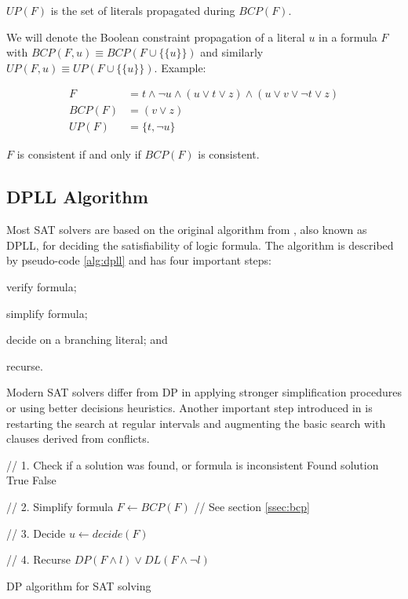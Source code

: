 \begin{mydef}
$UP(F)$ is the set of literals propagated during $BCP(F)$.
\end{mydef}

We will denote the Boolean constraint propagation of a literal $u$ in a
formula $F$ with $BCP(F, u) \equiv BCP(F \cup \{\{ u \}\})$
and similarly $UP(F, u) \equiv UP(F \cup \{\{ u \}\})$. Example:

\begin{align}
  F &= t \land \neg u \land (u \lor t \lor z) \land (u \lor v \lor \neg t \lor z) \\
  BCP(F) &= (v \lor z) \\
  UP(F) &= \{ t, \neg u \}
\end{align}

\begin{myprop}
  $F$ is consistent if and only if $BCP(F)$ is consistent.
\end{myprop}


\subsection{DPLL Algorithm}
\label{ssec:dpll}

Most SAT solvers are based on the original algorithm from
\cite{Davis:1962:MPT:368273.368557}, also known as DPLL, for deciding
the satisfiability of logic formula.  The algorithm is described
by pseudo-code \ref{alg:dpll} and has four important steps:
\begin{inparaenum}[1)]
  \item verify formula;
  \item simplify formula;
  \item decide on a branching literal; and
  \item recurse.
\end{inparaenum}

Modern SAT solvers differ from DP in applying
stronger simplification procedures or using better
decisions heuristics. Another important step introduced in
\cite{Marques-silva99grasp:a} is restarting the search at regular
intervals and augmenting the basic search with clauses derived
from conflicts.


\begin{algorithm}
  \begin{algorithmic}

    // 1. Check if a solution was found, or formula is inconsistent
      \PRINT Found solution
      \RETURN True
    \ENDIF
      \RETURN False
    \ENDIF

    // 2. Simplify formula
    \STATE $F \gets BCP(F)$ // See section \ref{ssec:bcp}

    // 3. Decide
    \STATE $u \gets decide(F)$

    // 4. Recurse
    \RETURN $DP(F \land l) \lor DL(F \land \neg l)$
  \end{algorithmic}

  \caption{DP algorithm for SAT solving}
  \label{alg:dpll}
\end{algorithm}


